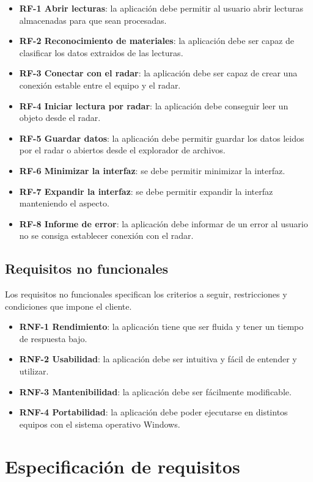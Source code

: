 \begin{itemize}
\item \textbf{RF-1 Abrir lecturas}: la aplicación debe permitir al usuario abrir lecturas almacenadas para que sean procesadas.
\item \textbf{RF-2 Reconocimiento de materiales}: la aplicación debe ser capaz de clasificar los datos extraidos de las lecturas.
\item \textbf{RF-3 Conectar con el radar}: la aplicación debe ser capaz de crear una conexión estable entre el equipo y el radar.
\item \textbf{RF-4 Iniciar lectura por radar}: la aplicación debe conseguir leer un objeto desde el radar.
\item \textbf{RF-5 Guardar datos}: la aplicación debe permitir guardar los datos leidos por el radar o abiertos desde el explorador de archivos.
\item \textbf{RF-6 Minimizar la interfaz}: se debe permitir minimizar la interfaz.
\item \textbf{RF-7 Expandir la interfaz}: se debe permitir expandir la interfaz manteniendo el aspecto.
\item \textbf{RF-8 Informe de error}: la aplicación debe informar de un error al usuario no se consiga establecer conexión con el radar.
\end{itemize}

\subsection{Requisitos no funcionales}
Los requisitos no funcionales specifican los criterios a seguir, restricciones y condiciones que impone el cliente.

\begin{itemize}
\item \textbf{RNF-1 Rendimiento}: la aplicación tiene que ser fluida y tener un tiempo de respuesta bajo.
\item \textbf{RNF-2 Usabilidad}: la aplicación debe ser intuitiva y fácil de entender y utilizar.
\item \textbf{RNF-3 Mantenibilidad}: la aplicación debe ser fácilmente modificable.
\item \textbf{RNF-4 Portabilidad}: la aplicación debe poder ejecutarse en distintos equipos con el sistema operativo Windows.
\end{itemize}

\section{Especificación de requisitos}

